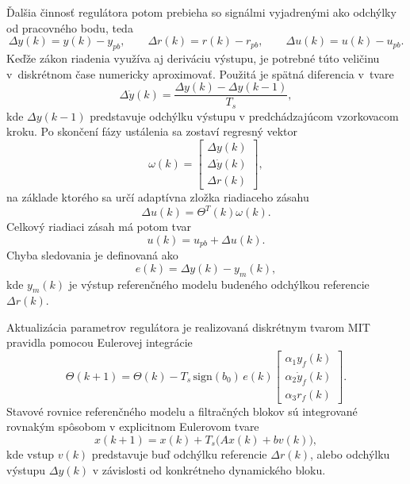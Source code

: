 Ďalšia činnosť regulátora potom prebieha
so signálmi vyjadrenými ako odchýlky
od pracovného bodu, teda
\begin{equation}
	\Delta y(k) = y(k) - y_{pb},
	\qquad
	\Delta r(k) = r(k) - r_{pb},
	\qquad
	\Delta u(k) = u(k) - u_{pb}.
\end{equation}
Keďže zákon riadenia využíva aj deriváciu výstupu,
je potrebné túto veličinu v~diskrétnom čase numericky aproximovať.
Použitá je spätná diferencia v~tvare
\begin{equation}
	\Delta \dot{y}(k)
	=
	\frac{\Delta y(k)-\Delta y(k-1)}{T_s},
\end{equation}
kde $\Delta y(k-1)$ predstavuje odchýlku výstupu
v predchádzajúcom vzorkovacom kroku.
Po skončení fázy ustálenia sa zostaví regresný vektor
\begin{equation}
	\omega(k)
	=
	\begin{bmatrix}
		\Delta y(k) \\
		\Delta \dot{y}(k) \\
		\Delta r(k)
	\end{bmatrix},
\end{equation}
na základe ktorého sa určí adaptívna zložka riadiaceho zásahu
\begin{equation}
	\Delta u(k)=\Theta^T(k)\omega(k).
\end{equation}
Celkový riadiaci zásah má potom tvar
\begin{equation}
	u(k)=u_{pb}+\Delta u(k).
\end{equation}
Chyba sledovania je definovaná ako
\begin{equation}
	e(k)=\Delta y(k)-y_m(k),
\end{equation}
kde $y_m(k)$ je výstup referenčného modelu
budeného odchýlkou referencie $\Delta r(k)$.

Aktualizácia parametrov regulátora
je realizovaná diskrétnym tvarom MIT pravidla
pomocou Eulerovej integrácie
\begin{equation}
	\Theta(k+1)
	=
	\Theta(k)
	-
	T_s\,\mathrm{sign}(b_0)\,e(k)
	\begin{bmatrix}
		\alpha_1 y_f(k) \\
		\alpha_2 \dot{y}_f(k) \\
		\alpha_3 r_f(k)
	\end{bmatrix}.
\end{equation}
Stavové rovnice referenčného modelu
a filtračných blokov
sú integrované rovnakým spôsobom
v explicitnom Eulerovom tvare
\begin{equation}
	x(k+1)
	=
	x(k)
	+
	T_s \bigl(Ax(k)+bv(k)\bigr),
\end{equation}
kde vstup $v(k)$ predstavuje
buď odchýlku referencie $\Delta r(k)$,
alebo odchýlku výstupu $\Delta y(k)$
v závislosti od konkrétneho dynamického bloku.

